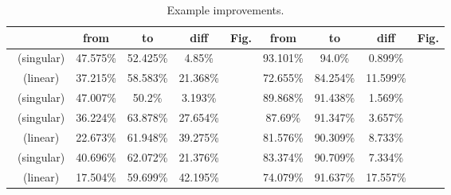 \begin{table}[t]
	\begin{center}
		\begin{tabular}{|c|c|c|c|c|c|c|c|c|}
			\hline
			 & from & to & diff & Fig. & from & to & diff & Fig. \\
			\hline
			\IPMAPIns~(singular) & 47.575\% & 52.425\% & 4.85\% &  & 93.101\% & 94.0\% & 0.899\% &  \\
			\hline
			\IPMAPIns~(linear) & 37.215\% & 58.583\% & 21.368\% &  & 72.655\% & 84.254\% & 11.599\% &  \\
			\hline
			\CXHIns~(singular) & 47.007\% & 50.2\% & 3.193\% &  & 89.868\% & 91.438\% & 1.569\% &  \\
			\hline
			\ResetIns~(singular) & 36.224\% & 63.878\% & 27.654\% &  & 87.69\% & 91.347\% & 3.657\% &  \\
			\hline
			\ResetIns~(linear) & 22.673\% & 61.948\% & 39.275\% &  & 81.576\% & 90.309\% & 8.733\% &  \\
			\hline
			\LPhaseIns~(singular) & 40.696\% & 62.072\% & 21.376\% &  & 83.374\% & 90.709\% & 7.334\% &  \\
			\hline
			\LPhaseIns~(linear) & 17.504\% & 59.699\% & 42.195\% &  & 74.079\% & 91.637\% & 17.557\% &  \\
			\hline
		\end{tabular}
	\end{center}
	\caption{Example improvements.}
	\label{tab:ex_improv}
\end{table}